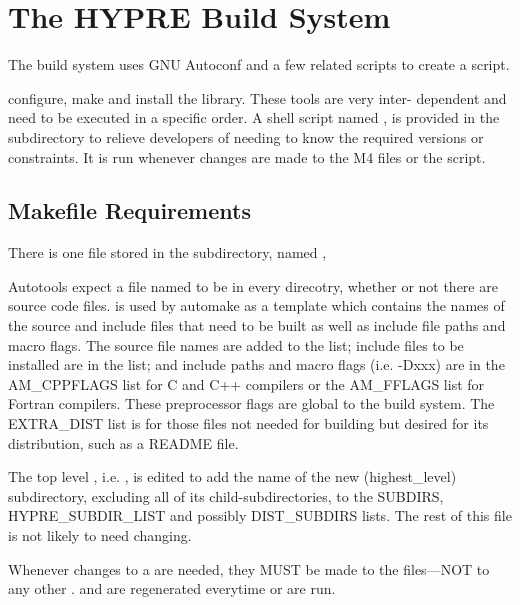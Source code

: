 
\chapter{The HYPRE Build System}
\label{The HYPRE Build System}


The \hypre{} build system uses GNU Autoconf and a few related scripts to 
create a  script. 


configure, make and install the library.  These tools are very inter-
dependent and need to be executed in a specific order. A shell script named 
, is provided in the  subdirectory to relieve 
developers of needing to know the required versions or constraints.  It is run 
whenever changes are made to the M4 files or the  script.

\section{Makefile Requirements}
\label{Makefile Requirements}


There is one file stored in the  subdirectory, named ,



Autotools expect a file named  to be in every direcotry, whether
or not there are source code files.   is used by automake as a
template which contains the names of the source and include files that need to 
be built as well as include file paths and macro flags.  The source file names 
are added to the  list; include files to be installed are in the 
 list; and include paths and macro flags (i.e. -Dxxx) are 
in the AM\_CPPFLAGS list for C and C++ compilers or the AM\_FFLAGS list for Fortran
compilers.  These preprocessor flags are global to the build system.  The 
EXTRA\_DIST list is for those files not needed for building \hypre{} but desired 
for its distribution, such as a README file. 

The top level , i.e. , is 
edited to add the name of the new (highest\_level) subdirectory, excluding all of
its child-subdirectories, to the SUBDIRS, HYPRE\_SUBDIR\_LIST and possibly 
DIST\_SUBDIRS lists.  The rest of this file is not likely to need changing.

Whenever changes to a  are needed, they MUST be made to the 
files---NOT to any other .
 and  are regenerated everytime 
or  are run.

